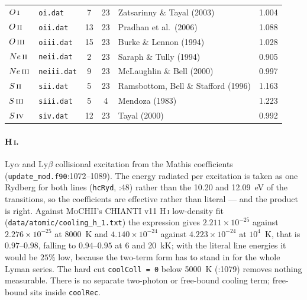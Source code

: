 \documentclass[english,a4paper]{my_memo}
\newcommand{\code}[1]{\texttt{#1}}
\newcommand{\MoCHII}{\textsc{MoCHII}}
\newcommand{\HI}{H\,\textsc{i}}
\newcommand{\OI}{O\,\textsc{i}}
\newcommand{\OII}{O\,\textsc{ii}}
\newcommand{\OIII}{O\,\textsc{iii}}
\newcommand{\SII}{S\,\textsc{ii}}
\newcommand{\SIII}{S\,\textsc{iii}}
\newcommand{\SIV}{S\,\textsc{iv}}
\newcommand{\NeII}{Ne\,\textsc{ii}}
\newcommand{\NeIII}{Ne\,\textsc{iii}}
\begin{document}
\begin{table}[htbp]
\begin{tabular}{llcclc}
$\OI{}$    & \code{oi.dat}    &  7 & 23 & Zatsarinny \& Tayal (2003)          & 1.004 \\
$\OII{}$   & \code{oii.dat}   & 13 & 23 & Pradhan et al.\ (2006)              & 1.088 \\
$\OIII{}$  & \code{oiii.dat}  & 15 & 23 & Burke \& Lennon (1994)              & 1.028 \\
$\NeII{}$  & \code{neii.dat}  &  2 & 23 & Saraph \& Tully (1994)              & 0.905 \\
$\NeIII{}$ & \code{neiii.dat} &  9 & 23 & McLaughlin \& Bell (2000)           & 0.997 \\
$\SII{}$   & \code{sii.dat}   &  5 & 23 & Ramsbottom, Bell \& Stafford (1996) & 1.163 \\
$\SIII{}$  & \code{siii.dat}  &  5 &  4 & Mendoza (1983)                      & 1.223 \\
$\SIV{}$   & \code{siv.dat}   & 12 & 23 & Tayal (2000)                        & 0.992 \\
\bottomrule
\end{tabular}
\end{table}

\paragraph{\HI{}.}  Ly$\alpha$ and Ly$\beta$ collisional excitation from the
Mathis coefficients (\code{update\_mod.f90}:1072--1089).  The energy radiated
per excitation is taken as one Rydberg for both lines (\code{hcRyd}, :48)
rather than the 10.20 and 12.09~eV of the transitions, so the coefficients are
effective rather than literal --- and the product is right.  Against
\MoCHII{}'s CHIANTI v11 \HI{} low-density fit
(\code{data/atomic/cooling\_h\_1.txt}) the expression gives
$2.211\times10^{-25}$ against $2.276\times10^{-25}$ at 8000~K and
$4.140\times10^{-24}$ against $4.223\times10^{-24}$ at $10^4$~K, that is
$0.97$--$0.98$, falling to $0.94$--$0.95$ at 6 and 20~kK; with the literal line
energies it would be $25\%$ low, because the two-term form has to stand in for
the whole Lyman series.  The hard cut \code{coolColl = 0} below 5000~K (:1079)
removes nothing measurable.  There is no separate two-photon or free-bound
cooling term; free-bound sits inside \code{coolRec}.
\end{document}
